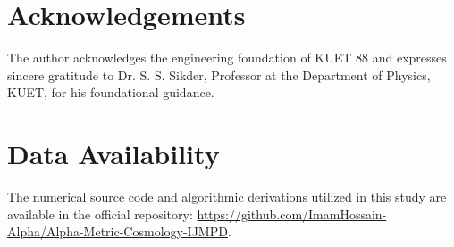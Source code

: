 \documentclass[12pt,a4paper]{article}
\begin{document}
\section*{Acknowledgements}
The author acknowledges the engineering foundation of KUET 88 and expresses sincere gratitude to Dr. S. S. Sikder, Professor at the Department of Physics, KUET, for his foundational guidance.

\section*{Data Availability}
The numerical source code and algorithmic derivations utilized in this study are available in the official repository: \url{https://github.com/ImamHossain-Alpha/Alpha-Metric-Cosmology-IJMPD}. 
\newpage
\end{document}

